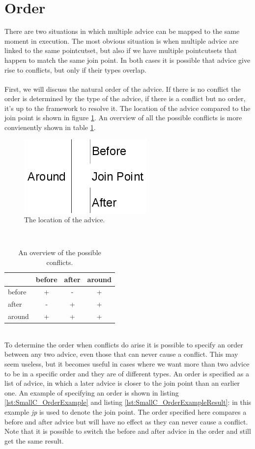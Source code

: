 \documentclass[a4paper]{report}
\begin{document}
\section{Order}
There are two situations in which multiple advice can be mapped to the same moment in execution. The most obvious situation is when multiple advice are linked to the same pointcutset, but also if we have multiple pointcutsets that happen to match the same join point. In both cases it is possible that advice give rise to conflicts, but only if their types overlap.\\
\\
First, we will discuss the natural order of the advice. If there is no conflict the order is determined by the type of the advice, if there is a conflict but no order, it's up to the framework to resolve it. The location of the advice compared to the join point is shown in figure \ref{fig:COrder}. An overview of all the possible conflicts is more convienently shown in table \ref{tab:SmallC_Conflicts}.
\begin{figure}[h!]
\centering
\includegraphics[scale=0.7]{images/AOFC/Order.png}
\caption{The location of the advice.}
\label{fig:COrder}
\end{figure}\\
\begin{table}[h!]
\centering
\begin{tabular}{l|c|c|c}
& before & after & around\\
\hline
before & + & - & + \\
\hline
after & - & + & + \\
\hline
around & + & + & +\\
\hline
\end{tabular}
\caption{An overview of the possible conflicts.}
\label{tab:SmallC_Conflicts}
\end{table}\\
To determine the order when conflicts do arise it is possible to specify an order between any two advice, even those that can never cause a conflict. This may seem useless, but it becomes useful in cases where we want more than two advice to be in a specific order and they are of different types. An order is specified as a list of advice, in which a later advice is closer to the join point than an earlier one. An example of specifying an order is shown in listing \ref{lst:SmallC_OrderExample} and listing \ref{lst:SmallC_OrderExampleResult}: in this example \textit{jp} is used to denote the join point. The order specified here compares a before and after advice but will have no effect as they can never cause a conflict. Note that it is possible to switch the before and after advice in the order and still get the same result.\\
\end{document}
